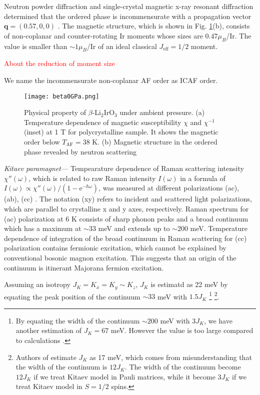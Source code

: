 Neutron powder diffraction and single-crystal magnetic x-ray resonant diffraction determined that the ordered phase is incommensurate with a propagation vector $\bm{q} = (0.57, 0, 0)$ \cite{Biffin2014}.
The magnetic structure, which is shown in Fig. \ref{beta0GPa}(b), consists of non-coplanar and counter-rotating Ir moments whose sizes are $0.47 \mu_B$/Ir.
The value is smaller than $\sim 1 \mu_B$/Ir of an ideal classical $J_{\mathrm{eff}} = 1/2$ moment.

\textcolor{red}{About the reduction of moment size}

We name the incommensurate non-coplanar AF order as ICAF order.

\begin{figure}
  \centering
  \texttt{[image: beta0GPa.png]}
  \caption{Physical property of $\beta$-Li$_2$IrO$_3$ under ambient pressure.
  (a) Temperature dependence of magnetic susceptibility $\chi$ and $\chi^{-1}$ (inset) at 1 T for polycrystalline sample\cite{takayama2015hyperhoneycomb}.
  It shows the magnetic order below $T_{\mathrm{AF}} = 38$ K.
  (b) Magnetic structure in the ordered phase revealed by neutron scattering \cite{Biffin2014}}
  \label{beta0GPa}
\end{figure}

\vspace{3mm}
\noindent\textit{Kitaev paramagnet---} Tempearature dependence of Raman scattering intensity $\chi''(\omega)$, which is related to raw Raman intensity $I(\omega)$ in a formula of $I(\omega) \propto \chi''(\omega)/(1-\mathrm{e}^{-\hbar\omega})$, was measured at different polarizations (ac), (ab), (cc) \cite{glamazda2016raman}.
The notation (xy) refers to incident and scattered light polarizations, which are parallel to crystalline x and y axes, respectively.
Raman spectrum for (ac) polarization at 6 K consists of sharp phonon peaks and a broad continuum which has a maximum at $\sim 33$ meV and extends up to $\sim 200$ meV.
Temperature dependence of integration of the broad continuum in Raman scattering for (cc) polarization contains fermionic excitation, which cannot be explained by conventional bosonic magnon excitation.
This suggests that an origin of the continuum is itinerant Majorana fermion excitation.

Assuming an isotropy $J_K = K_x = K_y \sim K_z$, $J_K$ is estimatd as 22 meV by equating the peak position of the continuum $\sim 33$ meV with $1.5J_K$
\footnote{By equating the width of the continuum $\sim 200$ meV with $3J_K$, we have another estimation of $J_K =67$ meV.
However the value is too large compared to calculations \cite{}.}
\footnote{Authors of \cite{glamazda2016raman} estimate $J_K$ as 17 meV, which comes from misunderstanding that the width of the continuum is $12J_K$.
The width of the continuum become $12J_K$ if we treat Kitaev model in Pauli matrices, while it become $3J_K$ if we treat Kitaev model in $S = 1/2$ spins.
}.

